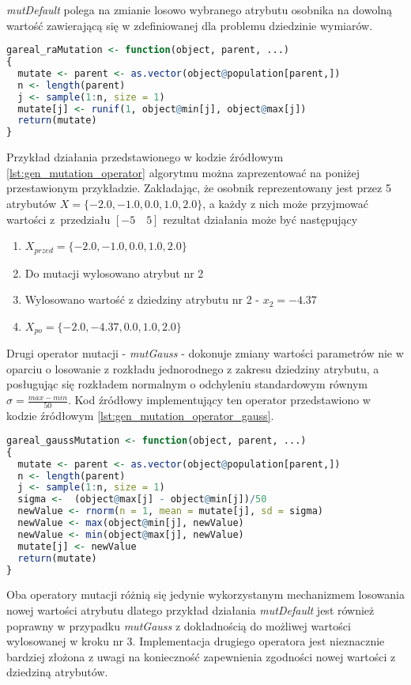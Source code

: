 \par
\emph{mutDefault} polega na zmianie losowo wybranego atrybutu osobnika na dowolną wartość zawierającą się w zdefiniowanej dla problemu dziedzinie wymiarów. 
\begin{lstlisting}[caption=Domyślny operator mutacji z pakietu \emph{GA} dla języka \emph{R}, label=lst:gen_mutation_operator, mathescape, breaklines=true, language=R]
gareal_raMutation <- function(object, parent, ...)
{
  mutate <- parent <- as.vector(object@population[parent,])
  n <- length(parent)
  j <- sample(1:n, size = 1)
  mutate[j] <- runif(1, object@min[j], object@max[j])
  return(mutate)
}
\end{lstlisting}
\par
Przykład działania przedstawionego w kodzie źródłowym \ref{lst:gen_mutation_operator} algorytmu można zaprezentować na poniżej przestawionym przykładzie. Zakładając, że osobnik reprezentowany jest przez 5 atrybutów $X=\lbrace-2.0,-1.0,0.0,1.0,2.0\rbrace$, a każdy z nich może przyjmować wartości z~przedziału $[-5\quad5]$ rezultat działania może być następujący
\begin{enumerate}
\item $X_{przed}=\lbrace-2.0,-1.0,0.0,1.0,2.0\rbrace$
\item Do mutacji wylosowano atrybut nr 2
\item Wylosowano wartość z dziedziny atrybutu nr 2 - $x_2=-4.37$
\item $X_{po}=\lbrace-2.0,-4.37,0.0,1.0,2.0\rbrace$
\end{enumerate}

\par
Drugi operator mutacji - \emph{mutGauss} - dokonuje zmiany wartości parametrów nie w oparciu o losowanie z rozkładu jednorodnego z zakresu dziedziny atrybutu, a posługując się rozkładem normalnym o odchyleniu standardowym równym $\sigma=\frac{max - min}{50}$. Kod źródłowy implementujący ten operator przedstawiono w kodzie źródłowym \ref{lst:gen_mutation_operator_gauss}.
\begin{lstlisting}[caption=Operator mutacji zmieniający wartości zgodnie z rozkładem normalnym, label=lst:gen_mutation_operator_gauss, mathescape, breaklines=true, language=R]
gareal_gaussMutation <- function(object, parent, ...)
{
  mutate <- parent <- as.vector(object@population[parent,])
  n <- length(parent)
  j <- sample(1:n, size = 1)
  sigma <-  (object@max[j] - object@min[j])/50
  newValue <- rnorm(n = 1, mean = mutate[j], sd = sigma)
  newValue <- max(object@min[j], newValue)
  newValue <- min(object@max[j], newValue)
  mutate[j] <- newValue
  return(mutate)
}
\end{lstlisting}
\par
Oba operatory mutacji różnią się jedynie wykorzystanym mechanizmem losowania nowej wartości atrybutu dlatego przykład działania \emph{mutDefault} jest również poprawny w przypadku \emph{mutGauss} z dokładnością do możliwej wartości wylosowanej w kroku nr 3. Implementacja  drugiego operatora jest nieznacznie bardziej złożona z uwagi na konieczność zapewnienia zgodności nowej wartości z dziedziną atrybutów.

